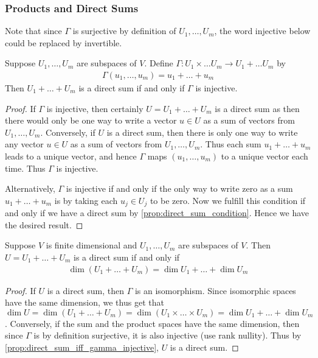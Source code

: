 \documentclass{article}
\begin{document}
\subsubsection{Products and Direct Sums}
  Note that since $\Gamma$ is surjective by definition of $U_1, \dots, U_m$, the word injective below could be replaced by invertible.
  \begin{prop}\label{prop:direct_sum_iff_gamma_injective}
    Suppose $U_1, \dots, U_m$ are subspaces of $V$. Define $\Gamma: U_1 \times \dots U_m \to U_1 + \dots U_m$ by
    \begin{align*}
      \Gamma(u_1, \dots, u_m) = u_1 + \dots + u_m
    \end{align*}
    Then $U_1 + \dots + U_m$ is a direct sum if and only if $\Gamma$ is injective.
  \end{prop}
  \begin{proof}
    If $\Gamma$ is injective, then certainly $U = U_1 + \dots + U_m$ is a direct sum as then there would only be one way to write a vector $u \in U$ as a sum of vectors from $U_1, \dots,
    U_m$. Conversely, if $U$ is a direct sum, then there is only one way to write any vector $u \in U$ as a sum of vectors from $U_1, \dots, U_m$. Thus each sum $u_1 + \dots + u_m$ leads to
    a unique vector, and hence $\Gamma$ maps $(u_1, \dots, u_m)$ to a unique vector each time. Thus $\Gamma$ is injective.

    Alternatively, $\Gamma$ is injective if and only if the only way to write zero as a sum $u_1 + \dots + u_m$ is by taking each $u_j \in U_j$ to be zero. Now we fulfill this condition if
    and only if we have a direct sum by \eqref{prop:direct_sum_condition}. Hence we have the desired result.
  \end{proof}
  \begin{prop}
    Suppose $V$ is finite dimensional and $U_1, \dots, U_m$ are subspaces of $V$. Then $U = U_1 + \dots + U_m$ is a direct sum if and only if
    \begin{align*}
      \dim(U_1 + \dots + U_m) = \dim U_1 + \dots + \dim U_m
    \end{align*}
  \end{prop}
  \begin{proof}
    If $U$ is a direct sum, then $\Gamma$ is an isomorphism. Since isomorphic spaces have the same dimension, we thus get that $\dim U = \dim(U_1 + \dots + U_m) = \dim(U_1 \times \dots
    \times U_m) = \dim U_1 + \dots + \dim U_m$. Conversely, if the sum and the product spaces have the same dimension, then since $\Gamma$ is by definition surjective, it is also injective
    (use rank nullity). Thus by \eqref{prop:direct_sum_iff_gamma_injective}, $U$ is a direct sum.
  \end{proof}
\end{document}
